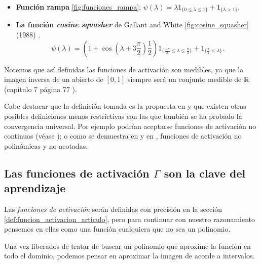 \begin{definicion}
\begin{itemize}
        \item \textbf{Función rampa} \ref{fig:funciones_rampa}: $\psi(\lambda)  = \lambda 1_{\{0 \leq \lambda \leq  1\}} + 1_{\{\lambda > 1\}}.$
    
        \item \textbf{La función \textit{cosine squasher}} de Gallant and White 
        \ref{fig:cosine_squasher} (1988) \cite{Gallant88thereexists}. 
        \begin{equation*}
    \psi(\lambda )= \left(1 + \cos\left(\lambda + 3 \frac{\pi}{2} \right) \frac{1}{2}\right) 
     1_{\{\frac{-\pi}{2} \leq \lambda \leq  \frac{\pi}{2}\}}
     +
     1_{\{ \frac{\pi}{2} < \lambda \}}.
    \end{equation*}
    \end{itemize}

   Notemos que así definidas las funciones de activación son medibles, ya que la imagen inversa de un abierto de $[0,1]$ siempre será un conjunto medible de  $\mathbb{R}$  (capítulo 7  página 77 \cite{nla.cat-vn1819421}).
    

    Cabe destacar que la definición tomada es la propuesta en \cite{HORNIK1989359} y que existen
    otras posibles definiciones menos restrictivas con las que también se ha probado la convergencia universal.
    Por ejemplo podrían aceptarse funciones de activación no continuas (véase \cite{FUNAHASHI1989183}); 
    o como 
    se demuestra en \cite{DBLP:journals/corr/SonodaM15} y en \cite{non-polynomial-activation-functions}, funciones de activación no polinómicas y no acotadas. 
\end{definicion}

\subsection*{Las funciones de activación $\Gamma$ son la clave del aprendizaje} 

\label{ch03:funcionamiento-intuitivo-funcion-activacion}

Las \textit{funciones de activación} serán definidas con precisión en la sección 
\ref{def:funcion_activacion_articulo}, pero para continuar con nuestro razonamiento 
pensemos en ellas como una función cualquiera que no sea un polinomio. 

Una vez liberados de tratar de buscar un polinomio que aproxime la función en todo
el dominio, podemos pensar en aproximar la imagen de acorde a intervalos.  
 

